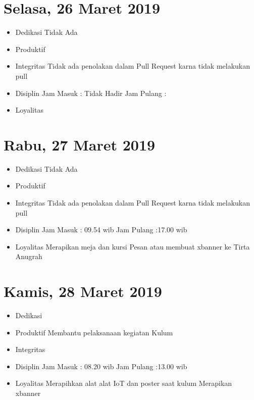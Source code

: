 \section{Selasa, 26 Maret 2019}
\begin{itemize}
\item Dedikasi
\subitem Tidak Ada

\item Produktif
 
\item Integritas
  \subitem Tidak ada penolakan dalam Pull Request karna tidak melakukan pull
\item Disiplin
  \subitem Jam Masuk : Tidak Hadir
  \subitem Jam Pulang :
\item Loyalitas
  \subitem 
\end{itemize}

\section{Rabu, 27 Maret 2019}
\begin{itemize}
\item Dedikasi
\subitem Tidak Ada
\item Produktif
  \subitem 
\item Integritas
  \subitem Tidak ada penolakan dalam Pull Request karna tidak melakukan pull
\item Disiplin
  \subitem Jam Masuk : 09.54 wib
  \subitem Jam Pulang :17.00 wib
\item Loyalitas
  \subitem Merapikan meja dan kursi
  \subitem Pesan atau membuat xbanner ke Tirta Anugrah
\end{itemize}

\section{Kamis, 28 Maret 2019}
\begin{itemize}
\item Dedikasi

\item Produktif
  \subitem Membantu pelaksanaan kegiatan Kulum

\item Integritas
  
\item Disiplin
  \subitem Jam Masuk : 08.20 wib
  \subitem Jam Pulang :13.00 wib
\item Loyalitas
  \subitem Merapihkan alat alat IoT dan poster saat kulum
  \subitem Merapikan xbanner
\end{itemize}

